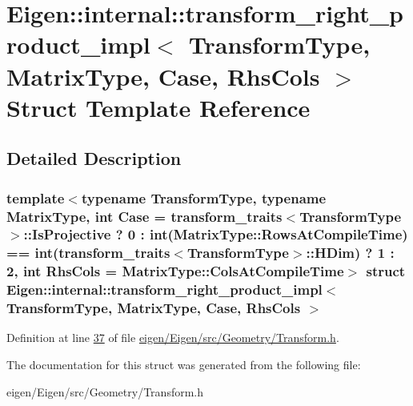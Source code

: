 \hypertarget{struct_eigen_1_1internal_1_1transform__right__product__impl}{}\section{Eigen\+:\+:internal\+:\+:transform\+\_\+right\+\_\+product\+\_\+impl$<$ Transform\+Type, Matrix\+Type, Case, Rhs\+Cols $>$ Struct Template Reference}
\label{struct_eigen_1_1internal_1_1transform__right__product__impl}


\subsection{Detailed Description}
\subsubsection*{template$<$typename Transform\+Type, typename Matrix\+Type, int Case = transform\+\_\+traits$<$\+Transform\+Type$>$\+::\+Is\+Projective ? 0 \+: int(\+Matrix\+Type\+::\+Rows\+At\+Compile\+Time) == int(transform\+\_\+traits$<$\+Transform\+Type$>$\+::\+H\+Dim) ? 1 \+: 2, int Rhs\+Cols = Matrix\+Type\+::\+Cols\+At\+Compile\+Time$>$\newline
struct Eigen\+::internal\+::transform\+\_\+right\+\_\+product\+\_\+impl$<$ Transform\+Type, Matrix\+Type, Case, Rhs\+Cols $>$}



Definition at line \hyperlink{eigen_2_eigen_2src_2_geometry_2_transform_8h_source_l00037}{37} of file \hyperlink{eigen_2_eigen_2src_2_geometry_2_transform_8h_source}{eigen/\+Eigen/src/\+Geometry/\+Transform.\+h}.



The documentation for this struct was generated from the following file\+:\begin{DoxyCompactItemize}
\item 
eigen/\+Eigen/src/\+Geometry/\+Transform.\+h\end{DoxyCompactItemize}
